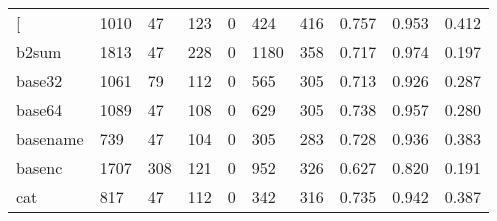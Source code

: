 \begin{longtable}{lp{2.0cm}p{2.0cm}p{2.0cm}p{2.0cm}p{2.0cm}p{2.0cm}p{2.0cm}p{2.0cm}p{2.0cm}}
\bottomrule
\endlastfoot
{[}         &                   1010 &                                 47 &                               123 &                                0 &                               424 &                             416 &                                0.757 &                                  0.953 &                                0.412 \\
b2sum     &                   1813 &                                 47 &                               228 &                                0 &                              1180 &                             358 &                                0.717 &                                  0.974 &                                0.197 \\
base32    &                   1061 &                                 79 &                               112 &                                0 &                               565 &                             305 &                                0.713 &                                  0.926 &                                0.287 \\
base64    &                   1089 &                                 47 &                               108 &                                0 &                               629 &                             305 &                                0.738 &                                  0.957 &                                0.280 \\
basename  &                    739 &                                 47 &                               104 &                                0 &                               305 &                             283 &                                0.728 &                                  0.936 &                                0.383 \\
basenc    &                   1707 &                                308 &                               121 &                                0 &                               952 &                             326 &                                0.627 &                                  0.820 &                                0.191 \\
cat       &                    817 &                                 47 &                               112 &                                0 &                               342 &                             316 &                                0.735 &                                  0.942 &                                0.387 \\

\end{longtable}
